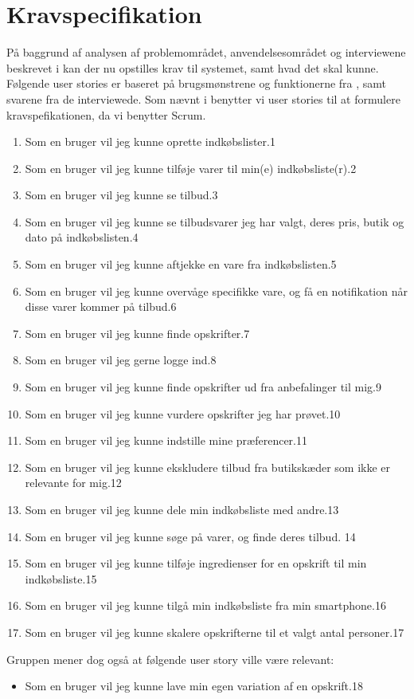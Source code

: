 \section{Kravspecifikation}\label{sec:krav}

På baggrund af analysen af problemområdet, anvendelsesområdet og interviewene beskrevet i   kan der nu opstilles krav til systemet, samt hvad det skal kunne.
Følgende user stories er baseret på brugsmønstrene og funktionerne fra , samt svarene fra de interviewede.
Som nævnt i  benytter vi user stories til at formulere kravspefikationen, da vi benytter Scrum.
\begin{enumerate}
	\item Som en bruger vil jeg kunne oprette indkøbslister.1
	\item Som en bruger vil jeg kunne tilføje varer til min(e) indkøbsliste(r).2
	\item Som en bruger vil jeg kunne se tilbud.3
	\item Som en bruger vil jeg kunne se tilbudsvarer jeg har valgt, deres pris, butik og dato på indkøbslisten.4
	\item Som en bruger vil jeg kunne aftjekke en vare fra indkøbslisten.5
	\item Som en bruger vil jeg kunne overvåge specifikke vare, og få en notifikation når disse varer kommer på tilbud.6
	\item Som en bruger vil jeg kunne finde opskrifter.7
	\item Som en bruger vil jeg gerne logge ind.8
	\item Som en bruger vil jeg kunne finde opskrifter ud fra anbefalinger til mig.9
	\item Som en bruger vil jeg kunne vurdere opskrifter jeg har prøvet.10
	\item Som en bruger vil jeg kunne indstille mine præferencer.11
	\item Som en bruger vil jeg kunne ekskludere tilbud fra butikskæder som ikke er relevante for mig.12
	\item Som en bruger vil jeg kunne dele min indkøbsliste med andre.13
	\item Som en bruger vil jeg kunne søge på varer, og finde deres tilbud. 14
	\item Som en bruger vil jeg kunne tilføje ingredienser for en opskrift til min indkøbsliste.15
	\item Som en bruger vil jeg kunne tilgå min indkøbsliste fra min smartphone.16
	\item Som en bruger vil jeg kunne skalere opskrifterne til et valgt antal personer.17
\end{enumerate}
Gruppen mener dog også at følgende user story ville være relevant: 
\begin{itemize}
	\item Som en bruger vil jeg kunne lave min egen variation af en opskrift.18
\end{itemize}

